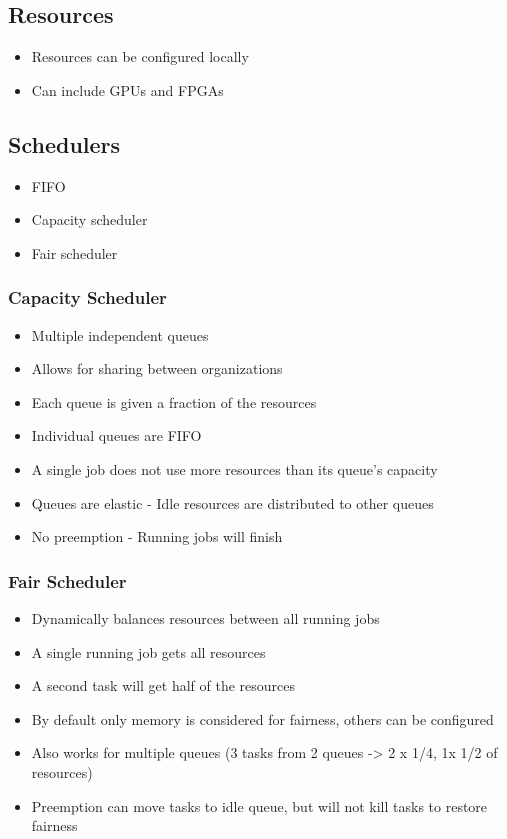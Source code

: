 \documentclass[10pt,a4paper]{scrreprt}
\begin{document}
\subsection{Resources}
\begin{itemize}
	\item Resources can be configured locally
	\item Can include GPUs and FPGAs
\end{itemize}

\subsection{Schedulers}
\begin{itemize}
	\item FIFO
	\item Capacity scheduler
	\item Fair scheduler
\end{itemize}

\subsubsection{Capacity Scheduler}
\begin{itemize}
	\item Multiple independent queues
	\item Allows for sharing between organizations
	\item Each queue is given a fraction of the resources
	\item Individual queues are FIFO
	\item A single job does not use more resources than its queue's capacity
	\item Queues are elastic - Idle resources are distributed to other queues
	\item No preemption - Running jobs will finish
\end{itemize}

\subsubsection{Fair Scheduler}
\begin{itemize}
	\item Dynamically balances resources between all running jobs
	\item A single running job gets all resources
	\item A second task will get half of the resources
	\item By default only memory is considered for fairness, others can be configured
	\item Also works for multiple queues (3 tasks from 2 queues -> 2 x 1/4, 1x 1/2 of resources)
	\item Preemption can move tasks to idle queue, but will not kill tasks to restore fairness
\end{itemize}
\end{document}

